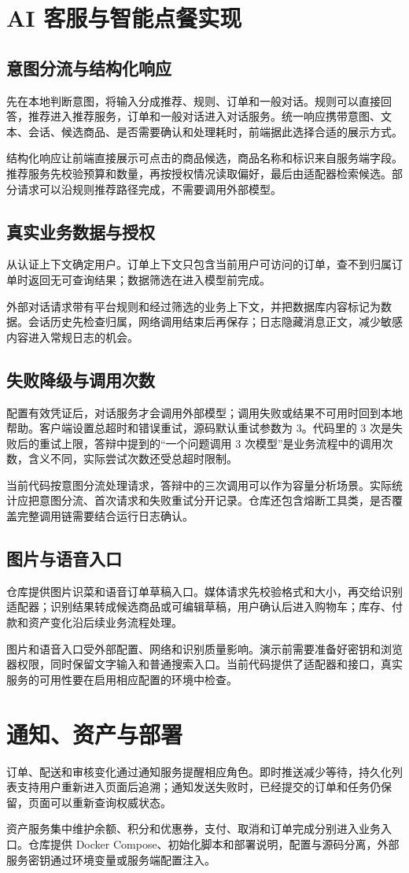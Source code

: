 \section{AI 客服与智能点餐实现}
\subsection{意图分流与结构化响应}
 先在本地判断意图，将输入分成推荐、规则、订单和一般对话。规则可以直接回答，推荐进入推荐服务，订单和一般对话进入对话服务。统一响应携带意图、文本、会话、候选商品、是否需要确认和处理耗时，前端据此选择合适的展示方式。

结构化响应让前端直接展示可点击的商品候选，商品名称和标识来自服务端字段。推荐服务先校验预算和数量，再按授权情况读取偏好，最后由适配器检索候选。部分请求可以沿规则推荐路径完成，不需要调用外部模型。
\subsection{真实业务数据与授权}
 从认证上下文确定用户。订单上下文只包含当前用户可访问的订单，查不到归属订单时返回无可查询结果；数据筛选在进入模型前完成。

外部对话请求带有平台规则和经过筛选的业务上下文，并把数据库内容标记为数据。会话历史先检查归属，网络调用结束后再保存；日志隐藏消息正文，减少敏感内容进入常规日志的机会。
\subsection{失败降级与调用次数}
配置有效凭证后，对话服务才会调用外部模型；调用失败或结果不可用时回到本地帮助。客户端设置总超时和错误重试，源码默认重试参数为 3。代码里的 3 次是失败后的重试上限，答辩中提到的“一个问题调用 3 次模型”是业务流程中的调用次数，含义不同，实际尝试次数还受总超时限制。

当前代码按意图分流处理请求，答辩中的三次调用可以作为容量分析场景。实际统计应把意图分流、首次请求和失败重试分开记录。仓库还包含熔断工具类，是否覆盖完整调用链需要结合运行日志确认。
\subsection{图片与语音入口}
仓库提供图片识菜和语音订单草稿入口。媒体请求先校验格式和大小，再交给识别适配器；识别结果转成候选商品或可编辑草稿，用户确认后进入购物车；库存、付款和资产变化沿后续业务流程处理。

图片和语音入口受外部配置、网络和识别质量影响。演示前需要准备好密钥和浏览器权限，同时保留文字输入和普通搜索入口。当前代码提供了适配器和接口，真实服务的可用性要在启用相应配置的环境中检查。
\section{通知、资产与部署}
订单、配送和审核变化通过通知服务提醒相应角色。即时推送减少等待，持久化列表支持用户重新进入页面后追溯；通知发送失败时，已经提交的订单和任务仍保留，页面可以重新查询权威状态。

资产服务集中维护余额、积分和优惠券，支付、取消和订单完成分别进入业务入口。仓库提供 Docker Compose、初始化脚本和部署说明，配置与源码分离，外部服务密钥通过环境变量或服务端配置注入。
